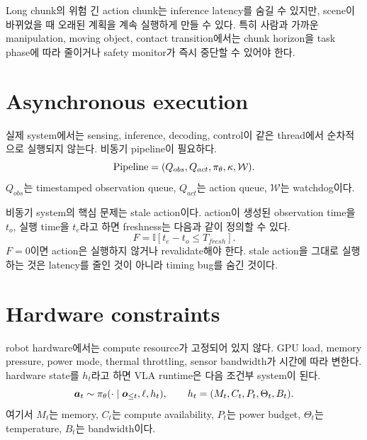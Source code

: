 \begin{warningbox}{Long chunk의 위험}
긴 action chunk는 inference latency를 숨길 수 있지만, scene이 바뀌었을 때 오래된 계획을 계속 실행하게 만들 수 있다. 특히 사람과 가까운 manipulation, moving object, contact transition에서는 chunk horizon을 task phase에 따라 줄이거나 safety monitor가 즉시 중단할 수 있어야 한다.
\end{warningbox}

\section{Asynchronous execution}

실제 system에서는 sensing, inference, decoding, control이 같은 thread에서 순차적으로 실행되지 않는다. 비동기 pipeline이 필요하다.
\begin{equation}
  \mathrm{Pipeline}
  =
  (
  Q_{obs},
  Q_{act},
  \pi_{\theta},
  \kappa,
  \mathcal{W}
  ).
  \label{eq:ch18-pipeline}
\end{equation}
$Q_{obs}$는 timestamped observation queue, $Q_{act}$는 action queue, $\mathcal{W}$는 watchdog이다.

비동기 system의 핵심 문제는 stale action이다. action이 생성된 observation time을 $t_o$, 실행 time을 $t_e$라고 하면 freshness는 다음과 같이 정의할 수 있다.
\begin{equation}
  F
  =
  \mathbb{I}
  [
  t_e - t_o \leq T_{fresh}
  ].
  \label{eq:ch18-freshness}
\end{equation}
$F=0$이면 action은 실행하지 않거나 revalidate해야 한다. stale action을 그대로 실행하는 것은 latency를 줄인 것이 아니라 timing bug를 숨긴 것이다.

\section{Hardware constraints}

robot hardware에서는 compute resource가 고정되어 있지 않다. GPU load, memory pressure, power mode, thermal throttling, sensor bandwidth가 시간에 따라 변한다. hardware state를 $h_t$라고 하면 VLA runtime은 다음 조건부 system이 된다.
\begin{equation}
  \bm{a}_t
  \sim
  \pi_{\theta}
  (\cdot \mid \bm{o}_{\leq t},\ell,h_t),
  \qquad
  h_t
  =
  (
  M_t,
  C_t,
  P_t,
  \Theta_t,
  B_t
  ).
  \label{eq:ch18-hardware-state}
\end{equation}
여기서 $M_t$는 memory, $C_t$는 compute availability, $P_t$는 power budget, $\Theta_t$는 temperature, $B_t$는 bandwidth이다.

